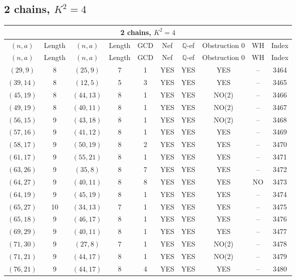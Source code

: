 \subsection{2 chains, $K^2 = 4$}
\begin{longtable}{|c|c|c|c|c|c|c|c|c|c|}
\hline
\multicolumn{10}{|c|}{2 chains, $K^2 = 4$}\\
\hline
$(n,a)$ & Length & $(n,a)$ & Length & GCD & Nef & $\mathbb Q$-ef & Obstruction 0 & WH & Index\\
\hline
\endfirsthead

\hline
$(n,a)$ & Length & $(n,a)$ & Length & GCD & Nef & $\mathbb Q$-ef & Obstruction 0 & WH & Index\\
\hline
\endhead
\hline
\endfoot

$(29, 9)$ & 8 & $(25, 9)$ & 7 & 1 & YES & YES & YES & -- & 3464\\
$(39, 14)$ & 8 & $(12, 5)$ & 5 & 3 & YES & YES & YES & -- & 3465\\
$(45, 19)$ & 8 & $(44, 13)$ & 8 & 1 & YES & YES & NO(2) & -- & 3466\\
$(49, 19)$ & 8 & $(40, 11)$ & 8 & 1 & YES & YES & NO(2) & -- & 3467\\
$(56, 15)$ & 9 & $(43, 18)$ & 8 & 1 & YES & YES & NO(2) & -- & 3468\\
$(57, 16)$ & 9 & $(41, 12)$ & 8 & 1 & YES & YES & YES & -- & 3469\\
$(58, 17)$ & 9 & $(50, 19)$ & 8 & 2 & YES & YES & YES & -- & 3470\\
$(61, 17)$ & 9 & $(55, 21)$ & 8 & 1 & YES & YES & YES & -- & 3471\\
$(63, 26)$ & 9 & $(35, 8)$ & 8 & 7 & YES & YES & YES & -- & 3472\\
$(64, 27)$ & 9 & $(40, 11)$ & 8 & 8 & YES & YES & YES & NO & 3473\\
$(64, 19)$ & 9 & $(45, 19)$ & 8 & 1 & YES & YES & YES & -- & 3474\\
$(65, 27)$ & 10 & $(34, 13)$ & 7 & 1 & YES & YES & YES & -- & 3475\\
$(65, 18)$ & 9 & $(46, 17)$ & 8 & 1 & YES & YES & YES & -- & 3476\\
$(69, 29)$ & 9 & $(40, 11)$ & 8 & 1 & YES & YES & YES & -- & 3477\\
$(71, 30)$ & 9 & $(27, 8)$ & 7 & 1 & YES & YES & NO(2) & -- & 3478\\
$(71, 21)$ & 9 & $(44, 17)$ & 8 & 1 & YES & YES & NO(2) & -- & 3479\\
$(76, 21)$ & 9 & $(44, 17)$ & 8 & 4 & YES & YES & YES & -- & 3480\\

\end{longtable}
